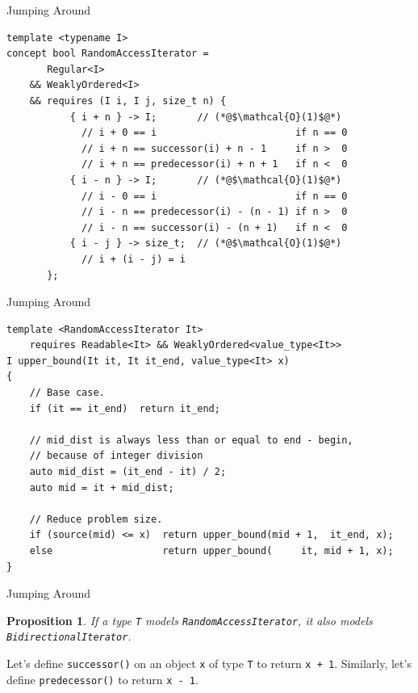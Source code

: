 \documentclass[aspectratio=169]{beamer}
\newtheorem{claim}{Proposition}
\begin{document}
\begin{frame}[fragile]{Jumping Around}
  \footnotesize
\begin{lstlisting}
template <typename I>
concept bool RandomAccessIterator =
       Regular<I>
    && WeaklyOrdered<I>
    && requires (I i, I j, size_t n) {
           { i + n } -> I;       // (*@$\mathcal{O}(1)$@*)
             // i + 0 == i                        if n == 0
             // i + n == successor(i) + n - 1     if n >  0
             // i + n == predecessor(i) + n + 1   if n <  0
           { i - n } -> I;       // (*@$\mathcal{O}(1)$@*)
             // i - 0 == i                        if n == 0
             // i - n == predecessor(i) - (n - 1) if n >  0
             // i - n == successor(i) - (n + 1)   if n <  0
           { i - j } -> size_t;  // (*@$\mathcal{O}(1)$@*)
             // i + (i - j) = i
       };
\end{lstlisting}
\end{frame}


\begin{frame}[fragile]{Jumping Around}
  \footnotesize
\begin{lstlisting}
template <RandomAccessIterator It>
    requires Readable<It> && WeaklyOrdered<value_type<It>>
I upper_bound(It it, It it_end, value_type<It> x)
{
    // Base case.
    if (it == it_end)  return it_end;

    // mid_dist is always less than or equal to end - begin,
    // because of integer division
    auto mid_dist = (it_end - it) / 2;
    auto mid = it + mid_dist;

    // Reduce problem size.
    if (source(mid) <= x)  return upper_bound(mid + 1,  it_end, x);
    else                   return upper_bound(     it, mid + 1, x);
}
\end{lstlisting}
\end{frame}


\begin{frame}[fragile]{Jumping Around}
  \begin{claim}
    If a type \texttt{T} models \texttt{RandomAccessIterator}, it also
    models \texttt{BidirectionalIterator}.
  \end{claim}
  \pause{}
  \begin{center}
    Let's define \texttt{successor()} on an object \texttt{x} of type
    \texttt{T} to return \texttt{x + 1}.  Similarly, let's define
    \texttt{predecessor()} to return \texttt{x - 1}.
  \end{center}
\end{frame}
\end{document}
